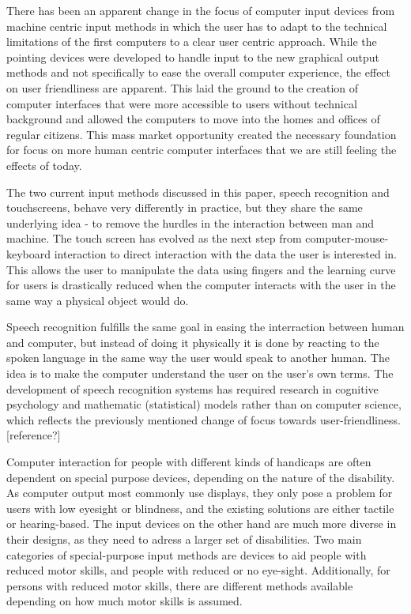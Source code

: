 
There has been an apparent change in the focus of computer input devices from machine centric input methods in which the user has to adapt to the technical limitations of the first computers to a clear user centric approach. While the pointing devices were developed to handle input to the new graphical output methods and not specifically to ease the overall computer experience, the effect on user friendliness are apparent. This laid the ground to the creation of computer interfaces that were more accessible to users without technical background and allowed the computers to move into the homes and offices of regular citizens. This mass market opportunity created the necessary foundation for focus on more human centric computer interfaces that we are still feeling the effects of today.


The two current input methods discussed in this paper, speech recognition and touchscreens, behave very differently in practice, but they share the same underlying idea - to remove the hurdles in the interaction between man and machine. The touch screen has evolved as the next step from computer-mouse-keyboard interaction to direct interaction with the data the user is interested in. This allows the user to manipulate the data using fingers and the learning curve for users is drastically reduced when the computer interacts with the user in the same way a physical object would do.

Speech recognition fulfills the same goal in easing the interraction between human and computer, but instead of doing it physically it is done by reacting to the spoken language in the same way the user would speak to another human. The idea is to make the computer understand the user on the user's own terms. The development of speech recognition systems has required research in cognitive psychology and mathematic (statistical) models rather than on computer science, which reflects the previously mentioned change of focus towards user-friendliness.[reference?] 


Computer interaction for people with different kinds of handicaps are often dependent on special purpose devices, depending on the nature of the disability. As computer output most commonly use displays, they only pose a problem for users with low eyesight or blindness, and the existing solutions are either tactile or hearing-based. The input devices on the other hand are much more diverse in their designs, as they need to adress a larger set of disabilities. Two main categories of special-purpose input methods are devices to aid people with reduced motor skills, and people with reduced or no eye-sight. Additionally, for persons with reduced motor skills, there are different methods available depending on how much motor skills is assumed.

